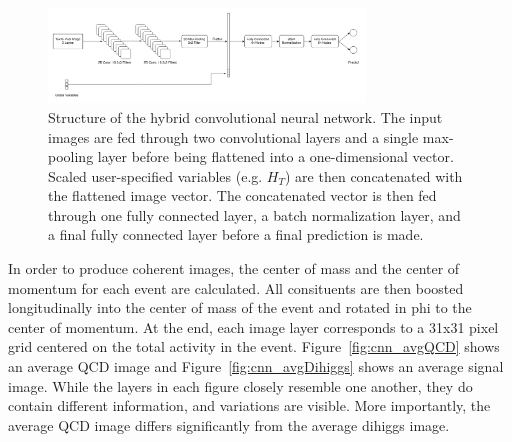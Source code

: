 \begin{figure}[!h] 
\begin{center}
\includegraphics*[width=0.75\textwidth] {CNN/figures/hybridCNN.png}
\caption{Structure of the hybrid convolutional neural network. The input images are fed through two convolutional layers and a single max-pooling layer before being flattened into a one-dimensional vector. Scaled user-specified variables (e.g. $H_{T}$) are then concatenated with the flattened image vector. The concatenated vector is then fed through one fully connected layer, a batch normalization layer, and a final fully connected layer before a final prediction is made.}
  \label{fig:cnn_hybrid}
\end{center}
\end{figure}

In order to produce coherent images, the center of mass and the center of momentum for each event are calculated. All consituents are then boosted longitudinally into the center of mass of the event and rotated in phi to the center of momentum. At the end, each image layer corresponds to a 31x31 pixel grid centered on the total activity in the event. Figure~\ref{fig:cnn_avgQCD} shows an average QCD image and Figure~\ref{fig:cnn_avgDihiggs} shows an average signal image. While the layers in each figure closely resemble one another, they do contain different information, and variations are visible. More importantly, the average QCD image differs significantly from the average dihiggs image. 

